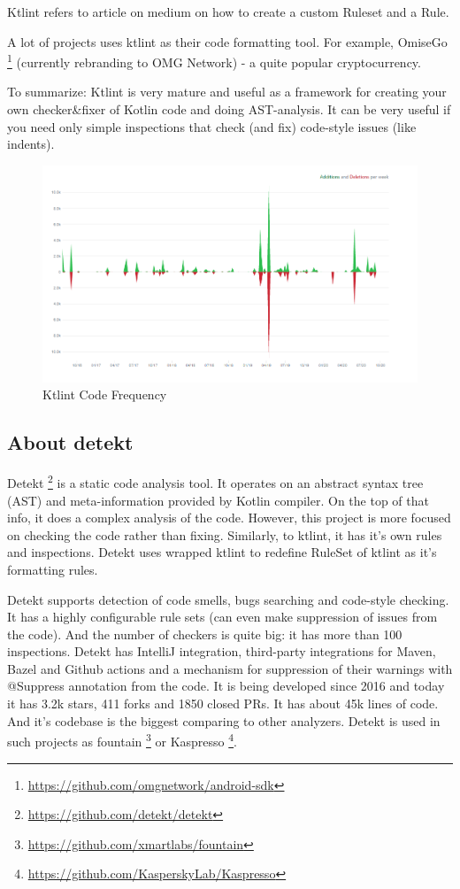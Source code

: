 Ktlint refers to article on medium on how to create a custom Ruleset and a Rule.

A lot of projects uses ktlint as their code formatting tool. For example, OmiseGo \footnote{\url{https://github.com/omgnetwork/android-sdk}} (currently rebranding to OMG Network) - a quite popular cryptocurrency.

To summarize: Ktlint is very mature and useful as a framework for creating your own checker\&fixer of Kotlin code and doing AST-analysis. It can be very useful if you need only simple inspections that check (and fix) code-style issues (like indents).

\begin{figure}[H]
    \centering
    \includegraphics[scale = 0.3]{pictures/ktlint.png}
    \caption{Ktlint Code Frequency}
    \label{fig:png_ktlint}
\end{figure}

\subsection{About detekt}
Detekt \footnote{\url{https://github.com/detekt/detekt}} is a static code analysis tool. It operates on an abstract syntax tree (AST) and meta-information provided by Kotlin compiler. On the top of that info, it does a complex analysis of the code. However, this project is more focused on checking the code rather than fixing. Similarly, to ktlint, it has it’s own rules and inspections. Detekt uses wrapped ktlint to redefine RuleSet of ktlint as it’s formatting rules.

Detekt supports detection of code smells, bugs searching and code-style checking. It has a highly configurable rule sets (can even make suppression of issues from the code). And the number of checkers is quite big: it has more than 100 inspections. Detekt has IntelliJ integration, third-party integrations for Maven, Bazel and Github actions and a mechanism for suppression of their warnings with @Suppress annotation from the code. It is being developed since 2016 and today it has 3.2k stars, 411 forks and 1850 closed PRs. It has about 45k lines of code. And it’s codebase is the biggest comparing to other analyzers.
Detekt is used in such projects as fountain \footnote{\url{https://github.com/xmartlabs/fountain}} or Kaspresso   \footnote{\url{https://github.com/KasperskyLab/Kaspresso}}.

